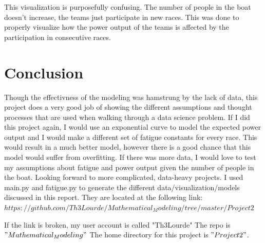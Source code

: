 \documentclass[12pt]{article} %
\begin{document}
This visualization is purposefully confusing. The number of people in the boat doesn't increase, the teams just participate in new races. This was done to properly visualize how the power output of the teams is affected by the participation in consecutive races.

\section*{Conclusion}
Though the effectivness of the modeling was hamstrung by the lack of data, this project does a very good job of showing the different assumptions and thought processes that are used when walking through a data science problem. If I did this project again, I would use an exponential curve to model the expected power output and I would make a different set of fatigue constants for every race. This would result in a much better model, however there is a good chance that this model would suffer from overfitting. If there was more data, I would love to test my assumptions about fatigue and power output given the number of people in the boat. Looking forward to more complicated, data-heavy projects. I used main.py and fatigue.py to generate the different data/visualization/models discussed in this report. They are located at the following link: $https://github.com/Th3Lourde/Mathematical_Modeling/tree/master/Project2$

If the link is broken, my user account is called "Th3Lourde"
The repo is $"Mathematical_Modeling"$
The home directory for this project is $"Project2"$.
\end{document}
